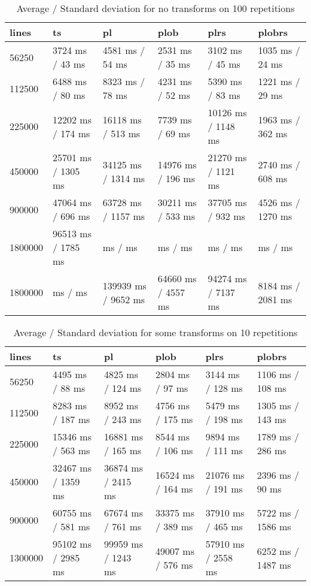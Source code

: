 \begin{table}[ht]
	\caption{Average / Standard deviation for no transforms on 100 repetitions}
	\label{tab:eval:none}
	\begin{tabular}{|l|l|l|l|l|l|}
		\hline
		lines   & ts                 & pl                  & plob               & plrs               & plobrs            \\
		\hline
		56250   & 3724 ms / 43 ms    & 4581 ms / 54 ms     & 2531 ms / 35 ms    & 3102 ms / 45 ms    & 1035 ms / 24 ms   \\
		112500  & 6488 ms / 80 ms    & 8323 ms / 78 ms     & 4231 ms / 52 ms    & 5390 ms / 83 ms    & 1221 ms / 29 ms   \\
		225000  & 12202 ms / 174 ms  & 16118 ms / 513 ms   & 7739 ms / 69 ms    & 10126 ms / 1148 ms & 1963 ms / 362 ms  \\
		450000  & 25701 ms / 1305 ms & 34125 ms / 1314 ms  & 14976 ms / 196 ms  & 21270 ms / 1121 ms & 2740 ms / 608 ms  \\
		900000  & 47064 ms / 696 ms  & 63728 ms / 1157 ms  & 30211 ms / 533 ms  & 37705 ms / 932 ms  & 4526 ms / 1270 ms \\
		1800000 & 96513 ms / 1785 ms & ms /  ms            & ms / ms            & ms / ms            & ms / ms           \\
		\hline
		1800000 & ms /  ms           & 139939 ms / 9652 ms & 64660 ms / 4557 ms & 94274 ms / 7137 ms & 8184 ms / 2081 ms \\
		\hline
	\end{tabular}
\end{table}

\begin{table}[ht]
	\caption{Average / Standard deviation for some transforms on 10 repetitions}
	\label{tab:eval:some}
	\begin{tabular}{|l|l|l|l|l|l|}
		\hline
		lines   & ts                 & pl                 & plob              & plrs               & plobrs            \\
		\hline
		56250   & 4495 ms / 88 ms    & 4825 ms / 124 ms   & 2804 ms / 97 ms   & 3144 ms / 128 ms   & 1106 ms / 108 ms  \\
		112500  & 8283 ms / 187 ms   & 8952 ms / 243 ms   & 4756 ms / 175 ms  & 5479 ms / 198 ms   & 1305 ms / 143 ms  \\
		225000  & 15346 ms / 563 ms  & 16881 ms / 165 ms  & 8544 ms / 106 ms  & 9894 ms / 111 ms   & 1789 ms / 286 ms  \\
		450000  & 32467 ms / 1359 ms & 36874 ms / 2415 ms & 16524 ms / 164 ms & 21076 ms / 191 ms  & 2396 ms / 90 ms   \\
		900000  & 60755 ms / 581 ms  & 67674 ms / 761 ms  & 33375 ms / 389 ms & 37910 ms / 465 ms  & 5722 ms / 1586 ms \\
		1300000 & 95102 ms / 2985 ms & 99959 ms / 1243 ms & 49007 ms / 576 ms & 57910 ms / 2558 ms & 6252 ms / 1487 ms \\
		\hline
	\end{tabular}
\end{table}

